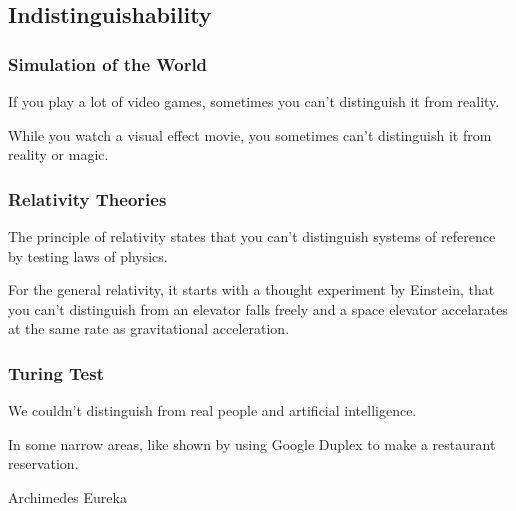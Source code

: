 \subsection*{Indistinguishability}

\subsubsection*{Simulation of the World}

If you play a lot of video games, sometimes you can't distinguish it from reality.

While you watch a visual effect movie, you sometimes can't distinguish it from reality or magic.



\subsubsection*{Relativity Theories}

The principle of relativity states that you can't distinguish systems of reference by testing laws of physics.

For the general relativity, it starts with a thought experiment by Einstein, that you can't distinguish from an elevator falls freely and a space elevator accelarates at the same rate as gravitational acceleration.


\subsubsection*{Turing Test}

We couldn't distinguish from real people and artificial intelligence.

In some narrow areas, like shown by using Google Duplex to make a restaurant reservation.

Archimedes Eureka
